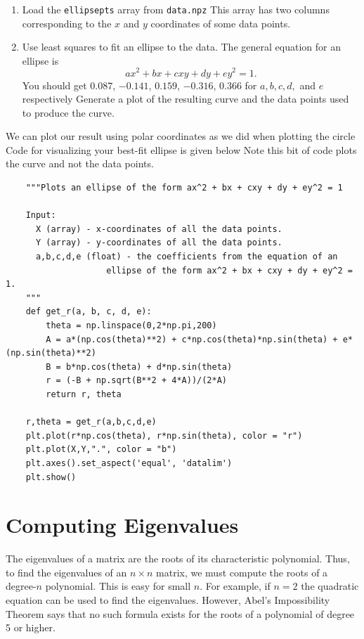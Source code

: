 \begin{problem}
\leavevmode
\begin{enumerate}
\item Load the \texttt{ellipsepts} array from \texttt{data.npz}
This array has two columns corresponding to the $x$ and $y$ coordinates of some data points.
\item Use least squares to fit an ellipse to the data.
The general equation for an ellipse is
\[
ax^2 + bx + cxy + dy + ey^2 = 1.
\]
You should get  $0.087$, $-0.141$,  $0.159$, $-0.316$, $0.366$ for $a, b, c, d,$ and $e$ respectively
Generate a plot of the resulting curve and the data points used to produce the curve.
\end{enumerate}

We can plot our result using polar coordinates as we did when plotting the circle
Code for visualizing your best-fit ellipse is given below
Note this bit of code plots the curve and not the data points.

\begin{lstlisting}
    """Plots an ellipse of the form ax^2 + bx + cxy + dy + ey^2 = 1

    Input:
      X (array) - x-coordinates of all the data points.
      Y (array) - y-coordinates of all the data points.
      a,b,c,d,e (float) - the coefficients from the equation of an
                    ellipse of the form ax^2 + bx + cxy + dy + ey^2 = 1.
    """
    def get_r(a, b, c, d, e):
        theta = np.linspace(0,2*np.pi,200)
        A = a*(np.cos(theta)**2) + c*np.cos(theta)*np.sin(theta) + e*(np.sin(theta)**2)
        B = b*np.cos(theta) + d*np.sin(theta)
        r = (-B + np.sqrt(B**2 + 4*A))/(2*A)
        return r, theta

    r,theta = get_r(a,b,c,d,e)
    plt.plot(r*np.cos(theta), r*np.sin(theta), color = "r")
    plt.plot(X,Y,".", color = "b")
    plt.axes().set_aspect('equal', 'datalim')
    plt.show()
\end{lstlisting}

\end{problem}

\section*{Computing Eigenvalues} %

The eigenvalues of a matrix are the roots of its characteristic polynomial.
Thus, to find the eigenvalues of an $n \times n$ matrix, we must compute the roots of a degree-$n$ polynomial.
This is easy for small $n$.
For example, if $n=2$ the quadratic equation can be used to find the eigenvalues.
However, Abel's Impossibility Theorem says that no such formula exists for the roots of a polynomial of degree 5 or higher.


